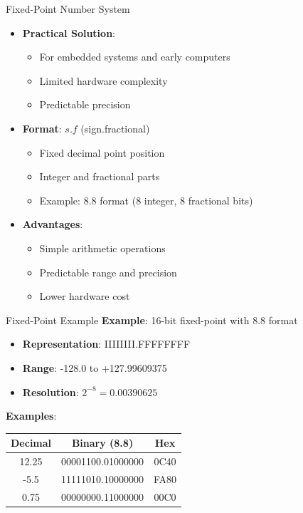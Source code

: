 \documentclass[aspectratio=169,11pt]{beamer}
\newcommand{\concept}[1]{\textbf{\color{accentcolor}#1}}
\begin{document}
\begin{frame}{Fixed-Point Number System}
\begin{itemize}
\item \concept{Practical Solution}:
\begin{itemize}
\item For embedded systems and early computers
\item Limited hardware complexity
\item Predictable precision
\end{itemize}
\vspace{0.5cm}
\item \concept{Format}: $s.f$ (sign.fractional)
\begin{itemize}
\item Fixed decimal point position
\item Integer and fractional parts
\item Example: 8.8 format (8 integer, 8 fractional bits)
\end{itemize}
\vspace{0.3cm}
\item \concept{Advantages}:
\begin{itemize}
\item Simple arithmetic operations
\item Predictable range and precision
\item Lower hardware cost
\end{itemize}
\end{itemize}
\end{frame}

\begin{frame}{Fixed-Point Example}
\concept{Example}: 16-bit fixed-point with 8.8 format

\vspace{0.3cm}
\begin{itemize}
\item \concept{Representation}: IIIIIIII.FFFFFFFF
\item \concept{Range}: -128.0 to +127.99609375
\item \concept{Resolution}: $2^{-8} = 0.00390625$
\end{itemize}

\vspace{0.5cm}
\concept{Examples}:
\begin{center}
\begin{tabular}{|c|c|c|}
\hline
\textbf{Decimal} & \textbf{Binary (8.8)} & \textbf{Hex} \\
\hline
12.25 & 00001100.01000000 & 0C40 \\
-5.5 & 11111010.10000000 & FA80 \\
0.75 & 00000000.11000000 & 00C0 \\
\hline
\end{tabular}
\end{center}
\end{frame}
\end{document}
